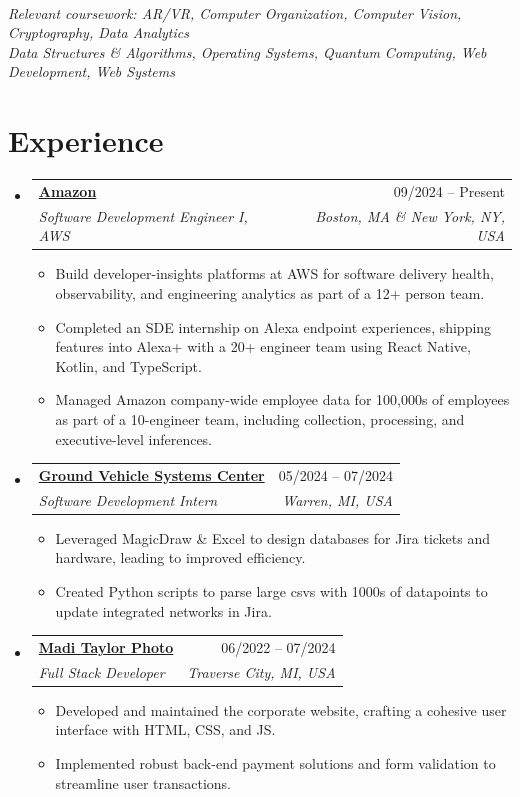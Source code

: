 \documentclass[letterpaper,11pt]{article}
\makeatletter
\newcommand{\resumeItem}[1]{
  \item\small{
    {#1 \vspace{-2pt}}
  }
}
\newcommand{\resumeSubheading}[4]{
  \vspace{-2pt}\item
    \begin{tabular*}{0.97\textwidth}[t]{l@{\extracolsep{\fill}}r}
      \textbf{#1} & #2 \\
      \textit{\small#3} & \textit{\small #4} \\
    \end{tabular*}\vspace{-7pt}
}
\newcommand{\resumeSubHeadingListStart}{\begin{itemize}[leftmargin=0.15in, label={}]}
\newcommand{\resumeSubHeadingListEnd}{\end{itemize}}
\newcommand{\resumeItemListStart}{\begin{itemize}}
\newcommand{\resumeItemListEnd}{\end{itemize}\vspace{-5pt}}
\makeatother
\begin{document}
    \emph{\setlength\parindent{24pt}\\
    \small{Relevant coursework: AR/VR, Computer Organization, Computer Vision, Cryptography, Data Analytics \\ Data Structures \& Algorithms, Operating Systems, Quantum Computing, Web Development, Web Systems}}

\vspace{-1em}
   

\section{Experience}
    \resumeSubHeadingListStart
        \resumeSubheading
            {\href{https://www.amazon.com}{Amazon}}{09/2024 -- Present}
            {Software Development Engineer I, AWS}{Boston, MA \& New York, NY, USA}
            \resumeItemListStart
                \resumeItem{Build developer-insights platforms at AWS for software delivery health, observability, and engineering analytics as part of a 12+ person team.}
                \resumeItem{Completed an SDE internship on Alexa endpoint experiences, shipping features into Alexa+ with a 20+ engineer team using React Native, Kotlin, and TypeScript.}
                \resumeItem{Managed Amazon company-wide employee data for 100,000s of employees as part of a 10-engineer team, including collection, processing, and executive-level inferences.}
            \resumeItemListEnd
        \resumeSubheading
            {\href{https://gvsc.devcom.army.mil}{Ground Vehicle Systems Center}}{05/2024 -- 07/2024}
            {Software Development Intern}{Warren, MI, USA}
            \resumeItemListStart
                \resumeItem{Leveraged MagicDraw \& Excel to design databases for Jira tickets and hardware, leading to improved efficiency.}
                \resumeItem{Created Python scripts to parse large csvs with 1000s of datapoints to update integrated networks in Jira.}
            \resumeItemListEnd
        \resumeSubheading
            {\href{https://maditaylorphoto.com}{Madi Taylor Photo}}{06/2022 -- 07/2024}
            {Full Stack Developer}{Traverse City, MI, USA}
            \resumeItemListStart
                \resumeItem{Developed and maintained the corporate website, crafting a cohesive user interface with HTML, CSS, and JS.}
                \resumeItem{Implemented robust back-end payment solutions and form validation to streamline user transactions.}
            \resumeItemListEnd
    \resumeSubHeadingListEnd
\end{document}
